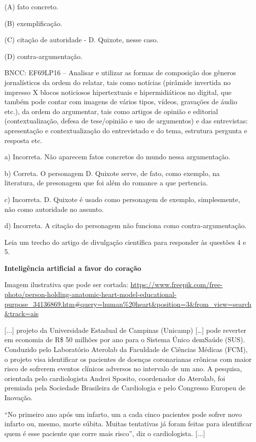 \begin{itemize}
\begin{itemize}
{\begin{itemize}
\begin{itemize}
\begin{escolha}
\begin{escolha}
\begin{escolha}
\begin{escolha}
\begin{escolha}
(A) fato concreto.

(B) exemplificação.

(C) citação de autoridade - D. Quixote, nesse caso.

(D) contra-argumentação.

BNCC: EF69LP16 -- Analisar e utilizar as formas de composição dos
gêneros jornalísticos da ordem do relatar, tais como notícias (pirâmide
invertida no impresso X blocos noticiosos hipertextuais e
hipermidiáticos no digital, que também pode contar com imagens de vários
tipos, vídeos, gravações de áudio etc.), da ordem do argumentar, tais
como artigos de opinião e editorial (contextualização, defesa de
tese/opinião e uso de argumentos) e das entrevistas: apresentação e
contextualização do entrevistado e do tema, estrutura pergunta e
resposta etc.

a) Incorreta. Não aparecem fatos concretos do mundo nessa argumentação.

b) Correta. O personagem D. Quixote serve, de fato, como exemplo, na
literatura, de presonagem que foi além do romance a que pertencia.

c) Incorreta. D. Quixote é usado como personagem de exemplo,
simplesmente, não como autoridade no assunto.

d) Incorreta. A citação do personagem não funciona como
contra-argumentação.

Leia um trecho do artigo de divulgação científica para responder às
questões 4 e 5.

\textbf{Inteligência artificial a favor do coração}

Imagem ilustrativa que pode ser cortada:
\url{https://www.freepik.com/free-photo/person-holding-anatomic-heart-model-educational-purpose_34136869.htm\#query=human\%20heart\&position=3\&from_view=search\&track=ais}

{[}...{]} projeto da Universidade Estadual de Campinas (Unicamp)
{[}\ldots{}{]} pode reverter em economia de R\$ 50 milhões por ano para
o Sistema Único demSaúde (SUS). Conduzido pelo Laboratório Aterolab da
Faculdade de Ciências Médicas (FCM), o projeto visa identificar os
pacientes de doenças coronarianas crônicas com maior risco de sofrerem
eventos clínicos adversos no intervalo de um ano. A pesquisa, orientada
pelo cardiologista Andrei Sposito, coordenador do Aterolab, foi premiada
pela Sociedade Brasileira de Cardiologia e pelo Congresso Europeu de
Inovação.

``No primeiro ano após um infarto, um a cada cinco pacientes pode sofrer
novo infarto ou, mesmo, morte súbita. Muitas tentativas já foram feitas
para identificar quem é esse paciente que corre mais risco'', diz o
cardiologista. {[}...{]}


\end{escolha}
\end{escolha}
\end{escolha}
\end{escolha}
\end{escolha}
\end{itemize}
\end{itemize}}
\end{itemize}
\end{itemize}
